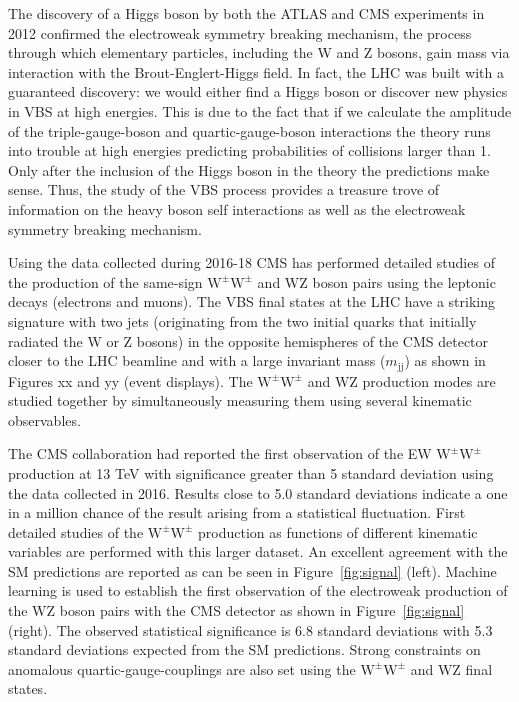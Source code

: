 \documentclass[12pt]{article}
\newcommand{\WZ}{\ensuremath{\mathrm{W}\mathrm{Z}}}
\newcommand{\WW}{\ensuremath{\mathrm{W}^\pm\mathrm{W}^\pm}}
\newcommand{\jet}{\ensuremath{\mathrm{j}}}
\newcommand{\mjj}{\ensuremath{m_{\jet\jet}}}
\begin{document}
The discovery of a Higgs boson by both the ATLAS and CMS experiments in 2012 confirmed the electroweak symmetry breaking mechanism, the process through which elementary particles, including the W and Z bosons, gain mass via interaction with the Brout-Englert-Higgs field.  In fact, the LHC was built with a guaranteed discovery: we would either find a Higgs boson or discover new physics in VBS at high energies. This is due to the fact that if we calculate the amplitude of the triple-gauge-boson and quartic-gauge-boson interactions the theory runs into trouble at high energies predicting probabilities of collisions larger than 1. Only after the inclusion of the Higgs boson in the theory the predictions make sense. Thus, the study of the VBS process provides a treasure trove of information on the heavy boson self interactions as well as the electroweak symmetry breaking mechanism.


Using the data collected during 2016-18 CMS has performed detailed studies of the production of the same-sign $\WW$ and $\WZ$ boson pairs using the leptonic decays (electrons and muons). The VBS final states at the LHC have a striking signature  with two jets (originating from the two initial quarks that initially radiated the W or Z bosons) in the opposite hemispheres of the CMS detector closer to the LHC beamline and with a large invariant mass ($\mjj$) as shown in Figures xx and yy (event displays). The $\WW$ and $\WZ$ production modes are studied together by simultaneously measuring them using several kinematic observables.  

The CMS collaboration had reported the first observation of the EW  $\WW$ production at 13 TeV with significance greater than 5 standard deviation using the data collected in 2016. Results close to 5.0 standard deviations indicate a one in a million chance of the result arising from a statistical fluctuation. First detailed studies of the $\WW$ production as functions of different kinematic variables are performed with this larger dataset. An excellent agreement with the SM predictions are reported as can be seen in Figure~\ref{fig:signal} (left). Machine learning is used to establish the first observation of the electroweak production of the $\WZ$ boson pairs with the CMS detector as shown in Figure~\ref{fig:signal} (right). The observed statistical significance is 6.8 standard deviations with 5.3 standard deviations expected from the SM predictions. Strong constraints on anomalous quartic-gauge-couplings are also set using the $\WW$ and $\WZ$ final states. 
\end{document}
